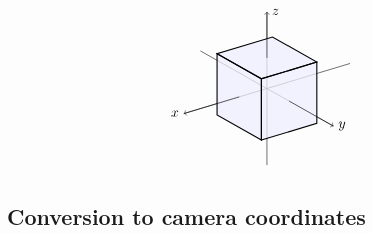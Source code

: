 \begin{equation*}
  \begin{tikzpicture}[x={(0.8cm,-0.45cm)},y={(1cm,0.3cm)},z={(0cm,1.1cm)},scale=0.7]
    \draw[->] (-3,0,0) -- (3,0,0) node[right]{$y$};
    \draw[->] (0,3,0) -- (0,-3,0) node[left]{$x$};
    \draw[->] (0,0,-2.5) -- (0,0,2.5) node[right]{$z$};
    \begin{scope}
      \clip (1,1,1) -- (1,1,-1) -- (1,-1,-1) -- (-1,-1,-1)
      -- (-1,-1,1) -- (-1,1,1) -- cycle;
      \fill[blue!5] (1,1,1) -- (1,1,-1) -- (1,-1,-1) -- (-1,-1,-1)
      -- (-1,-1,1) -- (-1,1,1) -- cycle;
      \draw[black!30,->] (-3,0,0) -- (3,0,0);
      \draw[black!30,->] (0,-3,0) -- (0,3,0);
      \draw[black!30,->] (0,0,-2.5) -- (0,0,2.5);
    \end{scope}
    \draw[thick] ( 1, 1, 1) -- ( 1, 1,-1) -- ( 1,-1,-1) -- ( 1,-1, 1) -- cycle;
    \draw[thick] ( 1,-1, 1) -- (-1,-1, 1) -- (-1,-1,-1) -- ( 1,-1,-1) -- cycle;
    \draw[thick] ( 1, 1, 1) -- ( 1,-1, 1) -- (-1,-1, 1) -- (-1, 1, 1) -- cycle;
    \draw (1,0,0) -- (3,0,0);
    \draw (0,-3,0) -- (0,-1,0);
    \draw (0,0,1) -- (0,0,2.5);
  \end{tikzpicture}
\end{equation*}

\subsection*{Conversion to camera coordinates}

